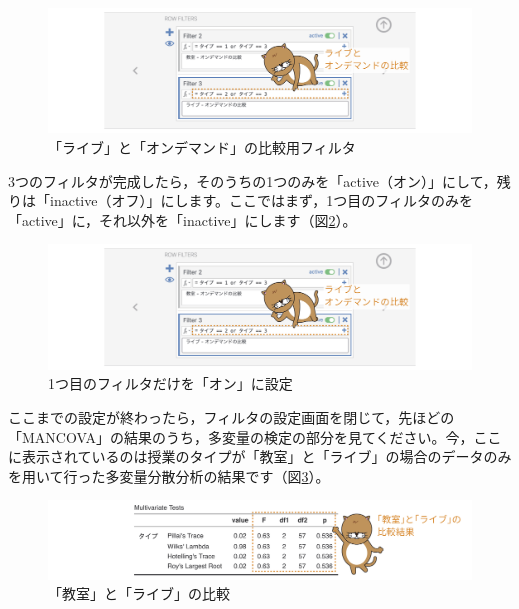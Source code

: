 \documentclass[
  12pt,
  a5jpaper,
  lualatex, ja=standard]{bxjsbook}
\begin{document}
\begin{figure}[!ht]

{\centering \includegraphics[width=1\linewidth]{images/ANOVA/mancova-filters4} 

}

\caption{「ライブ」と「オンデマンド」の比較用フィルタ}\label{fig:ANOVA-mancova-filters4}
\end{figure}

3つのフィルタが完成したら，そのうちの1つのみを「active（オン）」にして，残りは「inactive（オフ）」にします。ここではまず，1つ目のフィルタのみを「active」に，それ以外を「inactive」にします（図\ref{fig:ANOVA-mancova-filters5}）。

\begin{figure}[!ht]

{\centering \includegraphics[width=1\linewidth]{images/ANOVA/mancova-filters4} 

}

\caption{1つ目のフィルタだけを「オン」に設定}\label{fig:ANOVA-mancova-filters5}
\end{figure}

ここまでの設定が終わったら，フィルタの設定画面を閉じて，先ほどの「MANCOVA」の結果のうち，多変量の検定の部分を見てください。今，ここに表示されているのは授業のタイプが「教室」と「ライブ」の場合のデータのみを用いて行った多変量分散分析の結果です（図\ref{fig:ANOVA-mancova-posthoc-results}）。

\begin{figure}[!ht]

{\centering \includegraphics[width=1\linewidth]{images/ANOVA/mancova-posthoc-results} 

}

\caption{「教室」と「ライブ」の比較}\label{fig:ANOVA-mancova-posthoc-results}
\end{figure}
\end{document}
